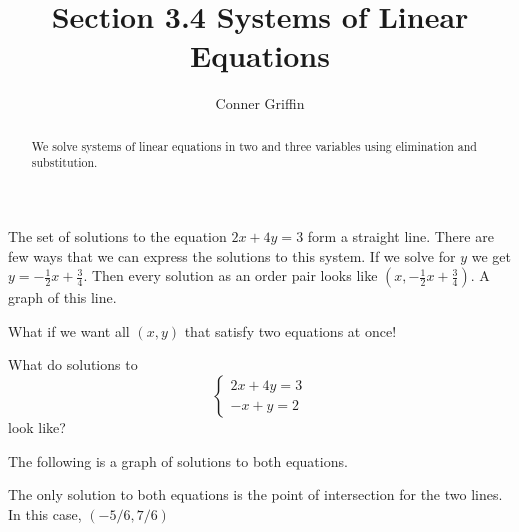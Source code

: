 \documentclass{ximera}
\title{Section 3.4 Systems of Linear Equations}
\author{Conner Griffin}
\begin{document}
\begin{abstract}
    We solve systems of linear equations in two and three variables using elimination and substitution.
\end{abstract}
\maketitle

The set of solutions to the equation \(2x+4y =3\) form a straight line. There are few ways that we can express the solutions to this system. If we solve for \(y\) we get \(y = -\frac{1}{2}x + \frac{3}{4}.\) Then every solution as an order pair looks like \(\left(x, -\frac{1}{2}x + \frac{3}{4}\right).\) A graph of this line.


What if we want all \((x,y)\) that satisfy two equations at once!

\begin{example}
    What do solutions to
    \[\begin{cases}
        2x+4y=3 \\
        -x+y =2
    \end{cases}\]
    look like?

    The following is a graph of solutions to both equations.


    The only solution to both equations is the point of intersection for the two lines. In this case, \(\left(-5/6,7/6\right)\)
\end{example}







\end{document}
